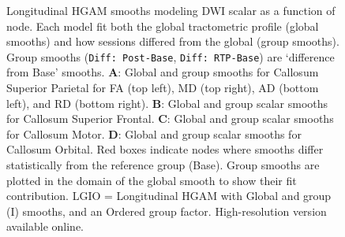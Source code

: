\documentclass[12pt]{article}
\begin{document}
\begin{figure}[H]
	\centering
	\caption{Longitudinal HGAM smooths modeling DWI scalar as a function of node. Each model fit both the global tractometric profile (global smooths) and how sessions differed from the global (group smooths). Group smooths (\lstinline{Diff: Post-Base}, \lstinline{Diff: RTP-Base}) are `difference from Base' smooths. \textbf{A}: Global and group smooths for Callosum Superior Parietal for FA (top left), MD (top right), AD (bottom left), and RD (bottom right). \textbf{B}: Global and group scalar smooths for Callosum Superior Frontal. \textbf{C}: Global and group scalar smooths for Callosum Motor. \textbf{D}: Global and group scalar smooths for Callosum Orbital. Red boxes indicate nodes where smooths differ statistically from the reference group (Base). Group smooths are plotted in the domain of the global smooth to show their fit contribution. LGIO = Longitudinal HGAM with Global and group (I) smooths, and an Ordered group factor. High-resolution version available online.}
	\label{fig:lgio-gam-cc}
\end{figure}
\end{document}

